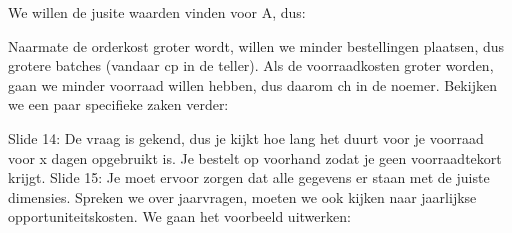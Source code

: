 \documentclass[10pt,a4paper]{report}
\begin{document}

We willen de jusite waarden vinden voor A, dus:









Naarmate de orderkost groter wordt, willen we minder bestellingen plaatsen, dus grotere batches (vandaar cp in de teller). Als de voorraadkosten groter worden, gaan we minder voorraad willen hebben, dus daarom ch in de noemer.
Bekijken we een paar specifieke zaken verder:













Slide 14: De vraag is gekend, dus je kijkt hoe lang het duurt voor je voorraad voor x dagen opgebruikt is. Je bestelt op voorhand zodat je geen voorraadtekort krijgt.
Slide 15: Je moet ervoor zorgen dat alle gegevens er staan met de juiste dimensies. Spreken we over jaarvragen, moeten we ook kijken naar jaarlijkse opportuniteitskosten. We gaan het voorbeeld uitwerken:










\end{document}
